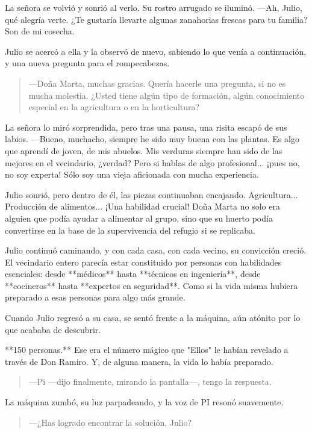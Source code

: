\documentclass[a4paper,12pt]{book}
\begin{document}
La señora se volvió y sonrió al verlo. Su rostro arrugado se iluminó. —Ah, Julio, qué alegría verte. ¿Te gustaría llevarte algunas zanahorias frescas para tu familia? Son de mi cosecha.

Julio se acercó a ella y la observó de nuevo, sabiendo lo que venía a continuación, y una nueva pregunta para el rompecabezas.

\begin{quote}
    —Doña Marta, muchas gracias. Quería hacerle una pregunta, si no es mucha molestia. ¿Usted tiene algún tipo de formación, algún conocimiento especial en la agricultura o en la horticultura?
\end{quote}

La señora lo miró sorprendida, pero tras una pausa, una risita escapó de sus labios. —Bueno, muchacho, siempre he sido muy buena con las plantas. Es algo que aprendí de joven, de mis abuelos. Mis verduras siempre han sido de las mejores en el vecindario, ¿verdad? Pero si hablas de algo profesional... ¡pues no, no soy experta! Sólo soy una vieja aficionada con mucha experiencia.

Julio sonrió, pero dentro de él, las piezas continuaban encajando. Agricultura... Producción de alimentos... ¡Una habilidad crucial! Doña Marta no solo era alguien que podía ayudar a alimentar al grupo, sino que su huerto podía convertirse en la base de la supervivencia del refugio si se replicaba.

Julio continuó caminando, y con cada casa, con cada vecino, su convicción creció. El vecindario entero parecía estar constituido por personas con habilidades esenciales: desde **médicos** hasta **técnicos en ingeniería**, desde **cocineros** hasta **expertos en seguridad**. Como si la vida misma hubiera preparado a esas personas para algo más grande.

Cuando Julio regresó a su casa, se sentó frente a la máquina, aún atónito por lo que acababa de descubrir.

**150 personas.** Ese era el número mágico que "Ellos" le habían revelado a través de Don Ramiro. Y, de alguna manera, la vida lo había preparado.

\begin{quote}
    —Pi —dijo finalmente, mirando la pantalla—, tengo la respuesta.
\end{quote}

La máquina zumbó, su luz parpadeando, y la voz de PI resonó suavemente.

\begin{quote}
    —¿Has logrado encontrar la solución, Julio?
\end{quote}
\end{document}
